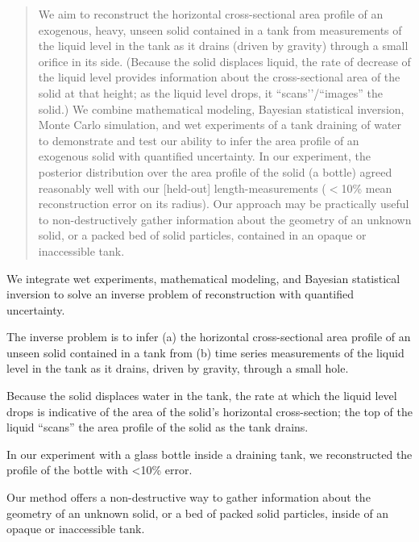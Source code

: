 \documentclass[a4paper,fleqn]{cas-dc}
\begin{document}
\begin{abstract}
We aim to reconstruct the horizontal cross-sectional area profile of an exogenous, heavy, unseen solid contained in a tank from measurements of the liquid level in the tank as it drains (driven by gravity) through a small orifice in its side. (Because the solid displaces liquid, the rate of decrease of the liquid level provides information about the cross-sectional area of the solid at that height; as the liquid level drops, it ``scans’'/``images'' the solid.) We combine mathematical modeling, Bayesian statistical inversion, Monte Carlo simulation, and wet experiments of a tank draining of water to demonstrate and test our ability to infer the area profile of an exogenous solid with quantified uncertainty. In our experiment, the posterior distribution over the area profile of the solid (a bottle) agreed reasonably well with our [held-out] length-measurements ($<$10\% mean reconstruction error on its radius). Our approach may be practically useful to non-destructively gather information about the geometry of an unknown solid, or a packed bed of solid particles, contained in an opaque or inaccessible tank.
\end{abstract}


\begin{highlights}
\item We integrate wet experiments, mathematical modeling, and Bayesian statistical inversion to solve an inverse problem of reconstruction with quantified uncertainty.
\item The inverse problem is to infer (a) the horizontal cross-sectional area profile of an unseen solid contained in a tank from (b) time series measurements of the liquid level in the tank as it drains, driven by gravity, through a small hole.
\item Because the solid displaces water in the tank, the rate at which the liquid level drops is indicative of the area of the solid's horizontal cross-section; the top of the liquid ``scans'' the area profile of the solid as the tank drains.
\item In our experiment with a glass bottle inside a draining tank, we reconstructed the profile of the bottle with <10\% error.
\item Our method offers a non-destructive way to gather information about the geometry of an unknown solid, or a bed of packed solid particles, inside of an opaque or inaccessible tank.
\end{highlights}
\end{document}

